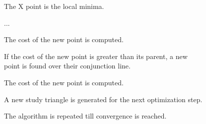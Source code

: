\begin{frame}
{\begin{columns}
\begin{figure}[h!]
                        
                    \end{figure} 
                \begin{itemize}
                    \item The \color{red} X \color{black} point is the local minima.
                    {
                    \item ...
                    \item The cost of the new point is computed.
                    \item If the cost of the new point is greater than its parent, a new point is found over their conjunction line.
                    \item The cost of the new point is computed.
                    \item A new study triangle is generated for the next optimization step. 
                    }
                    \item The algorithm is repeated till convergence is reached.        
                \end{itemize}
            \end{columns}
    }
\end{frame}